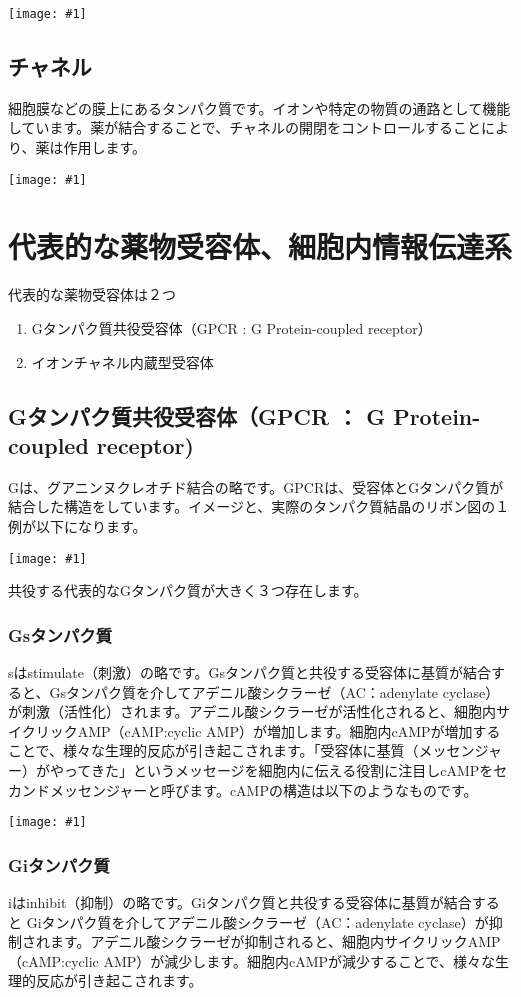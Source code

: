 \documentclass[a4paper,papersize,dvipdfmx]{jsarticle}
\newcommand{\pict}[2]{\begin{center} \texttt{[image: \#1]} \end{center}}   %
\begin{document}
\pict{imgs/sayo2.png}{10}

\subsection{チャネル}
細胞膜などの膜上にあるタンパク質です。イオンや特定の物質の通路として機能しています。薬が結合することで、チャネルの開閉をコントロールすることにより、薬は作用します。

\pict{imgs/sayo3.png}{10}

\section{代表的な薬物受容体、細胞内情報伝達系}

代表的な薬物受容体は２つ
\begin{enumerate}
\item Gタンパク質共役受容体（GPCR  :  G Protein-coupled receptor）
\item イオンチャネル内蔵型受容体


\end{enumerate}
\subsection{Gタンパク質共役受容体（GPCR ： G Protein-coupled receptor)}

Gは、グアニンヌクレオチド結合の略です。GPCRは、受容体とGタンパク質が結合した構造をしています。イメージと、実際のタンパク質結晶のリボン図の１例が以下になります。

\pict{imgs/c3-1.png}{10}

共役する代表的なGタンパク質が大きく３つ存在します。

\subsubsection{Gsタンパク質}
sはstimulate（刺激）の略です。Gsタンパク質と共役する受容体に基質が結合すると、Gsタンパク質を介してアデニル酸シクラーゼ（AC：adenylate cyclase）が刺激（活性化）されます。アデニル酸シクラーゼが活性化されると、細胞内サイクリックAMP（cAMP:cyclic AMP）が増加します。細胞内cAMPが増加することで、様々な生理的反応が引き起こされます。「受容体に基質（メッセンジャー）がやってきた」というメッセージを細胞内に伝える役割に注目しcAMPをセカンドメッセンジャーと呼びます。cAMPの構造は以下のようなものです。

\pict{imgs/c3-2.png}{10}

\subsubsection{Giタンパク質}
iはinhibit（抑制）の略です。Giタンパク質と共役する受容体に基質が結合すると
Giタンパク質を介してアデニル酸シクラーゼ（AC：adenylate cyclase）が抑制されます。アデニル酸シクラーゼが抑制されると、細胞内サイクリックAMP（cAMP:cyclic AMP）が減少します。細胞内cAMPが減少することで、様々な生理的反応が引き起こされます。
\end{document}
